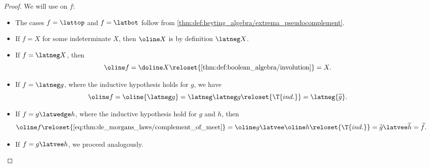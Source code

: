 \begin{proof}
  We will use  on \( f \):
  \begin{itemize}
    \item The cases \( f = \lattop \) and \( f = \latbot \) follow from \cref{thm:def:heyting_algebra/extrema_pseudocomplement}.

    \item If \( f = X \) for some indeterminate \( X \), then \( \oline X \) is by definition \( \latneg X \).

    \item If \( f = \latneg X \), then
    \begin{equation*}
      \oline f
      =
      \doline X
      \reloset {\ref{thm:def:boolean_algebra/involution}} =
      X.
    \end{equation*}

    \item If \( f = \latneg g \), where the inductive hypothesis holds for \( g \), we have
    \begin{equation*}
      \oline f
      =
      \oline {\latneg g}
      =
      \latneg \latneg g
      \reloset {\T{ind.}} =
      \latneg {\widetilde g}.
    \end{equation*}

    \item If \( f = g \latwedge h \), where the inductive hypothesis hold for \( g \) and \( h \), then
    \begin{equation*}
      \oline f
      \reloset {\eqref{eq:thm:de_morgans_laws/complement_of_meet}} =
      \oline g \latvee \oline h
      \reloset {\T{ind.}} =
      \widetilde g \latvee \widetilde h
      =
      \widetilde f.
    \end{equation*}

    \item If \( f = g \latvee h \), we proceed analogously.
  \end{itemize}
\end{proof}

